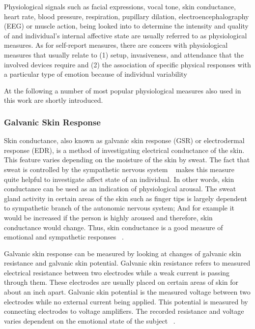Physiological signals such as facial expressions, vocal tone, skin conductance, heart rate, blood pressure, respiration, pupillary dilation, electroencephalography (EEG) or muscle action, being looked into to determine the intensity and quality of and individual's internal affective state are usually referred to as physiological measures. As for self-report measures, there are concers with physiological measures that usually relate to (1) setup, invasiveness, and attendance that the involved devices require and (2) the association of specific physical responses with a particular type of emotion because of individual variability ~\cite{depaula2005cognitive}

At the following a number of most popular physiological measures also used in this work are shortly introduced.

\subsubsection{Galvanic Skin Response}
Skin conductance, also known as galvanic skin response (GSR) or electrodermal response (EDR), is a method of investigating electrical conductance of the skin. This feature varies depending on the moisture of the skin by sweat. The fact that sweat is controlled by the sympathetic nervous system ~\cite{seiger2002essentials} makes this measure quite helpful to investigate affect state of an individual. In other words, skin conductance can be used as an indication of physiological arousal. The sweat gland activity in certain areas of the skin such as finger tips is largely dependent to sympathetic branch of the autonomic nervous system; And for example it would be increased if the person is highly aroused and therefore, skin conductance would change. Thus, skin conductance is a good measure of emotional and sympathetic responses ~\cite{carlson2013physiology}.

Galvanic skin response can be measured by looking at changes of galvanic skin resistance and galvanic skin potential. Galvanic skin resistance refers to measured electrical resistance between two electrodes while a weak current is passing through them. These electrodes are usually placed on certain areas of skin for about an inch apart. Galvanic skin potential is the measured voltage between two electrodes while no external current being applied. This potential is measured by connecting electrodes to voltage amplifiers. The recorded resistance and voltage varies dependent on the emotional state of the subject ~\cite{pflanzer2013galvanic}.

